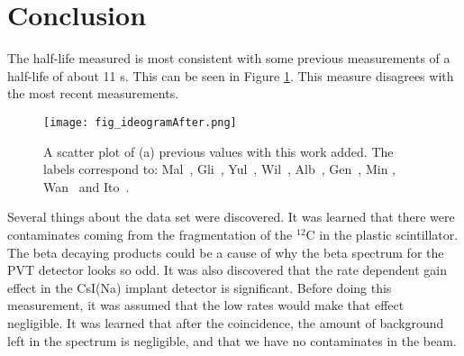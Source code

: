 \documentclass[main.tex]{subfiles}
\begin{document}
\section{Conclusion}
\label{sec:conclusion}

The half-life measured is most consistent with some previous measurements of a half-life of about 11 s. 
This can be seen in Figure \ref{fig:ideogramfinal}.
This measure disagrees with the most recent measurements.

\begin{figure}[!htb]
\centerline{\texttt{[image: fig\_ideogramAfter.png]}}
\caption{A scatter plot of (a) previous values with this work added.
	 The labels correspond to: Mal~\cite{Mal62}, Gli~\cite{Gli63},
	Yul~\cite{Yul67}, Wil~\cite{Wil70}, Alb~\cite{Alb75}, Gen~\cite{Gen76},
	Min \cite{Min87}, Wan~\cite{Wan92} and Ito~\cite{Ito95}.}
\label{fig:ideogramfinal}
\end{figure}

Several things about the data set were discovered.
It was learned that there were contaminates coming from the fragmentation of the $^{12}$C in the plastic scintillator.
The beta decaying products could be a cause of why the beta spectrum for the PVT detector looks so odd.
It was also discovered that the rate dependent gain effect in the CsI(Na) implant detector is significant.
Before doing this measurement, it was assumed that the low rates would make that effect negligible.
It was learned that after the coincidence, the amount of background left in the spectrum is negligible, and that we have no contaminates in the beam.
\end{document}

